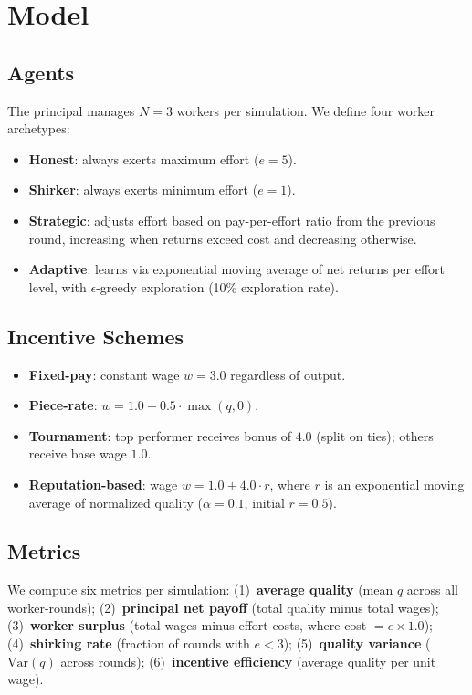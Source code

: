 \documentclass[11pt]{article}
\begin{document}
\section{Model}

\subsection{Agents}

The principal manages $N=3$ workers per simulation.
We define four worker archetypes:
\begin{itemize}
  \item \textbf{Honest}: always exerts maximum effort ($e=5$).
  \item \textbf{Shirker}: always exerts minimum effort ($e=1$).
  \item \textbf{Strategic}: adjusts effort based on pay-per-effort ratio from the previous round, increasing when returns exceed cost and decreasing otherwise.
  \item \textbf{Adaptive}: learns via exponential moving average of net returns per effort level, with $\epsilon$-greedy exploration (10\% exploration rate).
\end{itemize}

\subsection{Incentive Schemes}

\begin{itemize}
  \item \textbf{Fixed-pay}: constant wage $w = 3.0$ regardless of output.
  \item \textbf{Piece-rate}: $w = 1.0 + 0.5 \cdot \max(q, 0)$.
  \item \textbf{Tournament}: top performer receives bonus of $4.0$ (split on ties); others receive base wage $1.0$.
  \item \textbf{Reputation-based}: wage $w = 1.0 + 4.0 \cdot r$, where $r$ is an exponential moving average of normalized quality ($\alpha = 0.1$, initial $r = 0.5$).
\end{itemize}

\subsection{Metrics}

We compute six metrics per simulation:
(1)~\textbf{average quality} (mean $q$ across all worker-rounds);
(2)~\textbf{principal net payoff} (total quality minus total wages);
(3)~\textbf{worker surplus} (total wages minus effort costs, where cost $= e \times 1.0$);
(4)~\textbf{shirking rate} (fraction of rounds with $e < 3$);
(5)~\textbf{quality variance} ($\text{Var}(q)$ across rounds);
(6)~\textbf{incentive efficiency} (average quality per unit wage).
\end{document}
